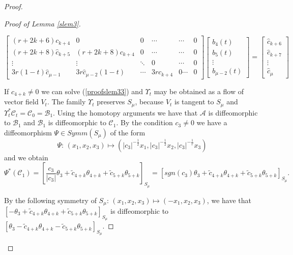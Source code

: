 \documentclass{amsart}
\theoremstyle{definition}
\numberwithin{equation}{section}
\begin{document}
\begin{proof}
\begin{proof}[Proof of Lemma \ref{slem3}]
\setlength{\arraycolsep}{0.5mm}
\begin{small}
\begin{equation}  \label{proofslem33}
\left[ \begin{array}{cccccc}
 (r\!+\!2k+6)c_{k\!+\!4} & 0  & 0 \  & \cdots & \cdots & 0 \\
  (r\!+\!2k+8)\hat{c}_{k\!+\!5} & (r\!+\!2k+8)c_{k\!+\!4}  & 0 \  & \cdots & \cdots & 0 \\
  \vdots & \vdots & \ddots & 0 &\cdots & 0 \\
  3r(1-t)\hat{c}_{\mu-1} & 3r\hat{c}_{\mu-2}(1-t) &\cdots & 3rc_{k\!+\!4} & 0 \cdots & 0
\end{array} \right]
\left[ \begin{array}{c} b_4(t)  \\ b_5(t) \\ \vdots  \\ b_{\mu-2}(t)  \end{array} \right] =
\left[ \begin{array}{c} 
\hat{c}_{k+6} \\ \hat{c}_{k+7}\\ \vdots \\  \hat{c}_{\mu}  \end{array}  \right]
\end{equation}
\end{small}

\noindent If \;$c_{4+k}\ne 0$ we can solve (\ref{proofslem33}) and $\Upsilon_t$ may be obtained as a flow of vector field $V_t$.
The family $\Upsilon_t$ preserves $S_{\mu}$, because $V_t$ is tangent to $S_{\mu}$ and $\Upsilon_t^*\mathcal{C}_t=\mathcal{C}_0=\mathcal{B}_1$.
Using the homotopy arguments we have that $\mathcal{A}$ is diffeomorphic to $ \mathcal{B}_1$ and $ \mathcal{B}_1$ is diffeomorphic to $ \mathcal{C}_1$.
By the condition $c_3\ne 0$ we have a diffeomorphism $\Psi \in Symm(S_{\mu})$ of the form
  \begin{equation}
\label{proofslem34}
\Psi:\,(x_1,x_2,x_3)\mapsto (|c_3|^{-\frac{1}{2}} x_1,|c_3|^{-\frac{1}{2}} x_2,|c_3|^{-\frac{1}{r}} x_3)
\end{equation}
and we obtain
\[ \Psi^*(\mathcal{C}_1)=[ \frac{c_3}{|c_3|}\theta_3+\widetilde{c}_{4+k} \theta_{4+k}+\widetilde{c}_{5+k} \theta_{5+k}]_{S_{\mu}} =
 [ sgn(c_3)\theta_3+\widetilde{c}_{4+k} \theta_{4+k}+\widetilde{c}_{5+k} \theta_{5+k}]_{S_{\mu}}.\]

 \noindent By the following symmetry of $S_{\mu}$: $(x_1,x_2,x_3)\mapsto (-x_1, x_2, x_3)$, we have that
 $[ -\theta_3+\widetilde{c}_{4+k} \theta_{4+k}+\widetilde{c}_{5+k} \theta_{5+k}]_{S_{\mu}}$ is diffeomorphic to $[ \theta_3-\widetilde{c}_{4+k} \theta_{4+k}-\widetilde{c}_{5+k} \theta_{5+k}]_{S_{\mu}}$.


\end{proof}
\end{proof}
\end{document}
